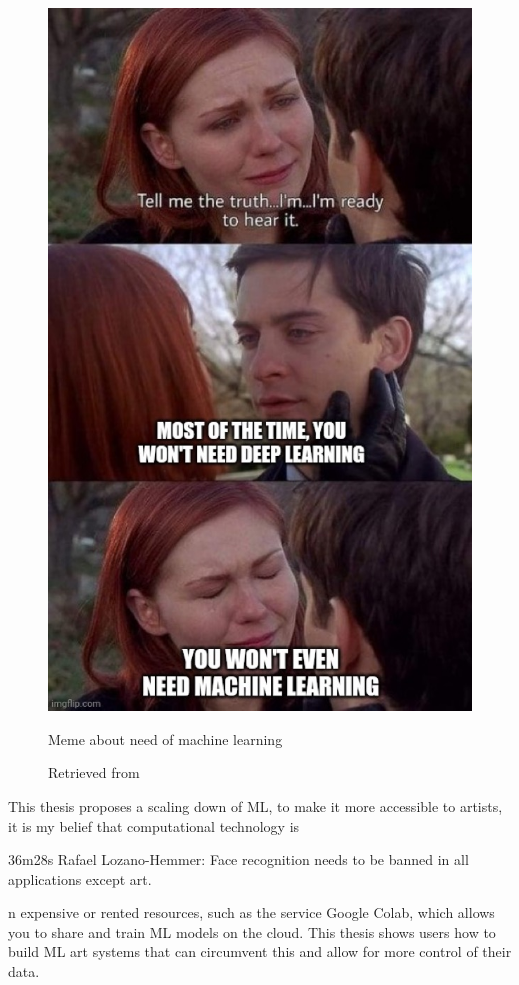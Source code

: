 \begin{figure}[ht]
  \centering
  \includegraphics[width=0.75\linewidth,height=0.40\textheight,keepaspectratio]{images/meme-spider-man.jpg}
  \caption{Meme about need of machine learning}
  \caption*{Retrieved from \cite{website-twitter-dynamicwebpaige-meme}}
  \label{fig:meme-spider-man}
\end{figure}

This thesis proposes a scaling down of \acrshort{ML}, to make it more accessible to artists, it is my belief that computational technology is 
 
\cite{website-talk-technology-and-public-art-rafael-lozano-hemmer}
36m28s
Rafael Lozano-Hemmer: Face recognition needs to be banned in all applications except art.

n expensive or rented resources, such as the service Google Colab, which allows you to share and train ML models on the cloud. This thesis shows users how to build \acrshort{ML} art systems that can circumvent this and allow for more control of their data.

